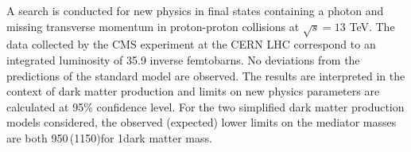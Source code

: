 % 
% 
%
A search is conducted for new physics in final states containing a photon and missing transverse momentum in proton-proton collisions at $\sqrt{s} = 13$ TeV.
The data collected by the CMS experiment at the CERN LHC correspond to an integrated luminosity of 35.9 inverse femtobarns.
No deviations from the predictions of the standard model are observed. 
The results are interpreted in the context of dark matter production and limits on new physics parameters are calculated at 95\% confidence level. 
For the two simplified dark matter production models considered, the observed (expected) lower limits on the mediator masses are both 950\,(1150)\GeV for 1\GeV dark matter mass.
